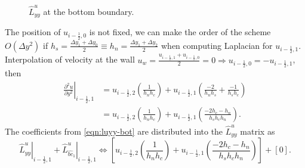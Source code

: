 \documentclass{article}
\numberwithin{equation}{section}
\begin{document}
\begin{figure}[H] %
  \caption{$\hat{L}^u_{yy}$ at the bottom boundary.}\label{fig:luxx-bottom}
\end{figure}

The position of $u_{i-\frac{1}{2},0}$ is not fixed, we can make the order of the scheme $O(\Delta y^2)$ if $h_s=\frac{\Delta y_1+\Delta y_0}{2}\equiv h_n=\frac{\Delta y_1+\Delta y_2}{2}$ when computing Laplacian for $u_{i-\frac{1}{2},1}$. Interpolation of velocity at the wall $u_{w} =\frac{u_{i-\frac{1}{2},1}+u_{i-\frac{1}{2},0}}{2}=0 \Rightarrow u_{i-\frac{1}{2},0}=-u_{i-\frac{1}{2},1}$, then
\begin{equation}\label{eqn:luyy-bot}
\begin{aligned}
\left.\frac{\partial^2 u}{\partial y^2}\right|_{i-\frac{1}{2},1} 
& =u_{i-\frac{1}{2},2}\left(\frac{1}{h_n h_c}\right)+u_{i-\frac{1}{2},1}\left(\frac{-2}{h_n h_s}+\frac{-1}{h_s h_c}\right) \\
& =u_{i-\frac{1}{2},2}\left(\frac{1}{h_n h_c}\right)+u_{i-\frac{1}{2},1}\left(\frac{-2 h_c- h_n}{h_s h_c h_n}\right).
\end{aligned}
\end{equation}
The coefficients from \cref{eqn:luyy-bot} are distributed into the $\hat{L}^u_{yy}$ matrix as
\begin{equation}
	\left.\hat{L}_{yy}^u\right|_{i-\frac{1}{2},1}+\left.\hat{L}^u_{\hat{bc}_1}\right|_{i-\frac{1}{2},1} \iff  \left[ u_{i-\frac{1}{2},2}\left(\frac{1}{h_n h_c}\right)+u_{i-\frac{1}{2},1}\left(\frac{-2 h_c- h_n}{h_s h_c h_n}\right)\right]+\left[0\right].
\end{equation}
\end{document}
